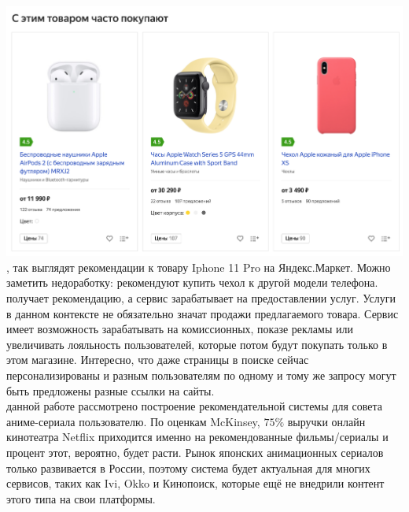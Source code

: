 \documentclass{article}
\newcommand\tab[1][1cm]{\hspace*{#1}}
\begin{document}
\tab\includegraphics[scale=0.30]{f1.png}\\
, так выглядят рекомендации к товару Iphone 11 Pro на Яндекс.Маркет. Можно заметить недоработку: рекомендуют купить чехол к другой модели телефона.\\
 получает рекомендацию, а сервис зарабатывает на предоставлении услуг. Услуги в данном контексте не обязательно значат продажи предлагаемого товара. Сервис имеет возможность зарабатывать на комиссионных, показе рекламы или увеличивать лояльность пользователей, которые потом будут покупать только в этом магазине. Интересно, что даже страницы в поиске сейчас персонализированы и разным пользователям по одному и тому же запросу могут быть предложены разные ссылки на сайты.\\
 данной работе рассмотрено построение рекомендательной системы для совета аниме-сериала пользователю. По оценкам McKinsey, $75\%$ выручки онлайн кинотеатра Netflix приходится именно на рекомендованные фильмы/сериалы и процент этот, вероятно, будет расти. Рынок японских анимационных сериалов только развивается в России, поэтому система будет актуальная для многих сервисов, таких как Ivi, Okko и Кинопоиск, которые ещё не внедрили контент этого типа на свои платформы.\\
\qquad 

\newpage
\end{document}
